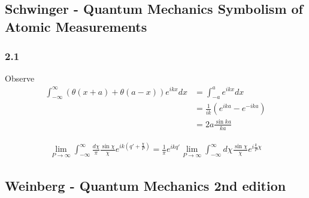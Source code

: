 \documentclass[10pt,a4paper]{article}
\theoremstyle{definition}
\begin{document}
\subsection{{\sc Schwinger} - Quantum Mechanics Symbolism of Atomic Measurements}
\subsubsection{2.1}
Observe
\begin{align}
    \int_{-\infty}^\infty\left(\theta(x+a)+\theta(a-x)\right)e^{ikx}dx
    &=\int_{-a}^ae^{ikx}dx\\
    &=\frac{1}{ik}\left(e^{ika}-e^{-ika}\right)\\
    &=2a \frac{\sin ka}{ka}
\end{align} 

\begin{align}
    \lim_{P\rightarrow\infty}\int_{-\infty}^\infty\frac{d\chi}{\pi}\frac{\sin\chi}{\chi}e^{ik\left(q'+\frac{\chi}{P}\right)}=\frac{1}{\pi}e^{ikq'}\lim_{P\rightarrow\infty}\int_{-\infty}^\infty d\chi\frac{\sin\chi}{\chi}e^{i\frac{k}{P}\chi}
\end{align} 



\subsection{{\sc Weinberg} - Quantum Mechanics 2nd edition}
\end{document}
